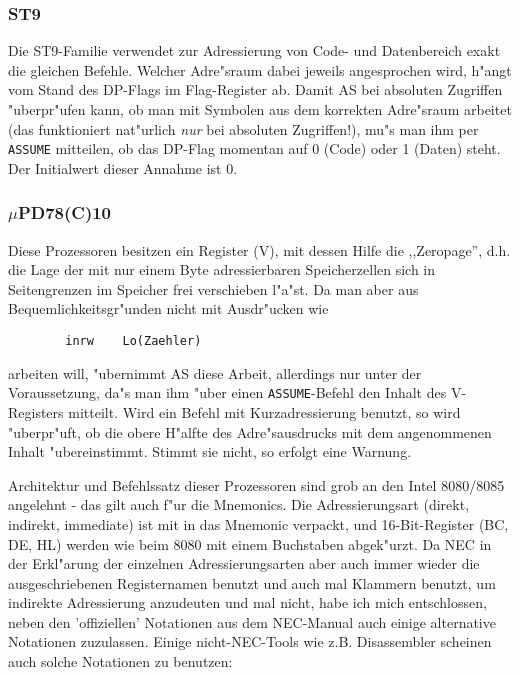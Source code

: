 \documentclass[12pt,a4paper,twoside]{report}
\newcommand{\tty}[1]{{\tt #1}}
\begin{document}
{%

\subsubsection{ST9}

Die ST9-Familie verwendet zur Adressierung von Code- und Datenbereich
exakt die gleichen Befehle.  Welcher Adre"sraum dabei jeweils
angesprochen wird, h"angt vom Stand des DP-Flags im Flag-Register ab.
Damit AS bei absoluten Zugriffen "uberpr"ufen kann, ob man mit Symbolen 
aus dem korrekten Adre"sraum arbeitet (das funktioniert nat"urlich {\em nur}
bei absoluten Zugriffen!), mu"s man ihm per \tty{ASSUME} mitteilen, ob das
DP-Flag momentan auf 0 (Code) oder 1 (Daten) steht.  Der Initialwert
dieser Annahme ist 0.


\subsubsection{$\mu$PD78(C)10}

Diese Prozessoren besitzen ein Register (V), mit dessen Hilfe die
,,Zeropage'', d.h. die Lage der mit nur einem Byte adressierbaren
Speicherzellen sich in Seitengrenzen im Speicher frei verschieben l"a"st.
Da man aber aus Bequemlichkeitsgr"unden nicht mit Ausdr"ucken wie
\begin{verbatim}
        inrw    Lo(Zaehler)
\end{verbatim}
arbeiten will, "ubernimmt AS diese Arbeit, allerdings nur unter der
Voraussetzung, da"s man ihm "uber einen \tty{ASSUME}-Befehl den
Inhalt des V-Registers mitteilt.  Wird ein Befehl mit Kurzadressierung
benutzt, so wird "uberpr"uft, ob die obere H"alfte des Adre"sausdrucks
mit dem angenommenen Inhalt "ubereinstimmt.  Stimmt sie nicht, so erfolgt
eine Warnung.

Architektur und Befehlssatz dieser Prozessoren sind grob an den
Intel 8080/8085 angelehnt - das gilt auch f"ur die Mnemonics.  Die
Adressierungsart (direkt, indirekt, immediate) ist mit in das
Mnemonic verpackt, und 16-Bit-Register (BC, DE, HL) werden wie
beim 8080 mit einem Buchstaben abgek"urzt.  Da NEC in der
Erkl"arung der einzelnen Adressierungsarten aber auch immer
wieder die ausgeschriebenen Registernamen benutzt und auch mal
Klammern benutzt, um indirekte Adressierung anzudeuten und mal
nicht, habe ich mich entschlossen, neben den 'offiziellen'
Notationen aus dem NEC-Manual auch einige alternative Notationen
zuzulassen.  Einige nicht-NEC-Tools wie z.B. Disassembler
scheinen auch solche Notationen zu benutzen:

}
\end{document}
